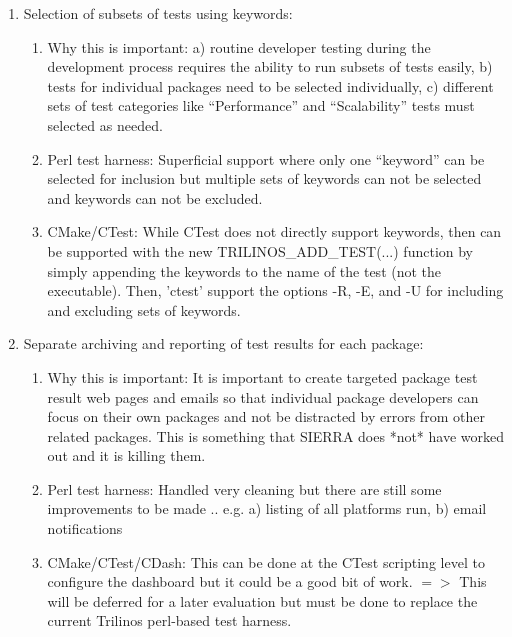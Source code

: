 \documentclass[pdf,ps2pdf,11pt]{SANDreport}
\begin{document}
\begin{enumerate}

{}\item Selection of subsets of tests using keywords:

  \begin{enumerate}

  {}\item Why this is important: a) routine developer testing during
  the development process requires the ability to run subsets of tests
  easily, b) tests for individual packages need to be selected
  individually, c) different sets of test categories like
  ``Performance'' and ``Scalability'' tests must selected as needed.

  {}\item Perl test harness: Superficial support where only one
  ``keyword'' can be selected for inclusion but multiple sets of
  keywords can not be selected and keywords can not be excluded.

  {}\item CMake/CTest: While CTest does not directly support keywords,
  then can be supported with the new TRILINOS\_ADD\_TEST(...) function
  by simply appending the keywords to the name of the test (not the
  executable).  Then, 'ctest' support the options -R, -E, and -U for
  including and excluding sets of keywords.

  \end{enumerate}

{}\item Separate archiving and reporting of test results for each
package:

  \begin{enumerate}

  {}\item Why this is important: It is important to create targeted
  package test result web pages and emails so that individual
  package developers can focus on their own packages and not be
  distracted by errors from other related packages.  This is
  something that SIERRA does *not* have worked out and it is killing
  them.

  {}\item Perl test harness: Handled very cleaning but there are
  still some improvements to be made .. e.g. a) listing of all
  platforms run, b) email notifications

  {}\item CMake/CTest/CDash: This can be done at the CTest scripting
  level to configure the dashboard but it could be a good bit of
  work. $=>$ This will be deferred for a later evaluation but must
  be done to replace the current Trilinos perl-based test harness.


\end{enumerate}
\end{enumerate}
\end{document}
